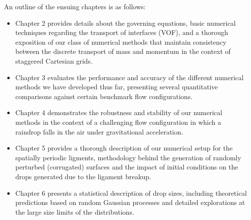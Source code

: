 \newpage

An outline of the ensuing chapters is as follows: 

\begin{itemize}
	\item Chapter 2 provides details about the governing equations, basic numerical techniques
		regarding the transport of interfaces (VOF), and a thorough exposition of our class 
		of numerical methods that maintain consistency between the discrete transport of mass
		and momentum in the context of staggered Cartesian grids.
	\item Chapter 3 evaluates the performance and accuracy of the different numerical methods
		we have developed thus far, presenting several quantitative comparisons 
		against certain benchmark flow configurations.  
	\item Chapter 4 demonstrates the robustness and stability of our numerical methods in the context of  
		a challenging flow configuration in which a raindrop falls in the air under gravitational acceleration.
	\item Chapter 5 provides a thorough description of our numerical setup for the spatially periodic
		ligments, methodology behind the generation of randomly perturbed (corrugated) surfaces 
		and the impact of initial conditions on the drops generated due to the ligament breakup.
	\item Chapter 6 presents a statistical description of drop sizes, including theoretical predictions 
		based on random Gaussian processes and detailed explorations at the large size limits of the distributions.  
\end{itemize}




















































